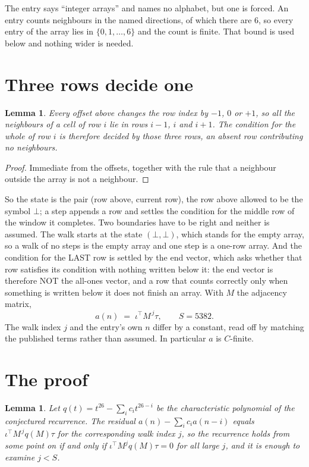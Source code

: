 \documentclass[11pt,a4paper]{article}
\theoremstyle{plain}
\newtheorem{lemma}[theorem]{Lemma}
\theoremstyle{definition}
\begin{document}
The entry says ``integer arrays'' and names no alphabet, but one is forced. An entry counts
neighbours in the named directions, of which there are $6$, so every entry of the array
lies in $\{0,1,\dots,6\}$ and the count is finite. That bound is used below and
nothing wider is needed.

\section{Three rows decide one}

\begin{lemma}\label{lem:win}
Every offset above changes the row index by $-1$, $0$ or $+1$, so all the neighbours of a cell
of row $i$ lie in rows $i-1$, $i$ and $i+1$. The condition for the whole of row $i$ is
therefore decided by those three rows, an absent row contributing no neighbours.
\end{lemma}

\begin{proof}
Immediate from the offsets, together with the rule that a neighbour outside the array is not a
neighbour.
\end{proof}

So the state is the pair (row above, current row), the row above allowed to be the symbol
$\bot$; a step appends a row and settles the condition for the middle row of the window it
completes. Two boundaries have to be right and neither is assumed. The walk starts at the state
$(\bot,\bot)$, which stands for the empty array, so a walk of no steps is the empty array and
one step is a one-row array. And the condition for the LAST row is settled by the end vector,
which asks whether that row satisfies its condition with nothing written below it: the end
vector is therefore NOT the all-ones vector, and a row that counts correctly only when
something is written below it does not finish an array. With $M$ the adjacency matrix,
\[
a(n)\;=\;\iota^{\!\top}M^{\,j}\tau ,\qquad S=5382.
\]
The walk index $j$ and the entry's own $n$ differ by a constant, read off by matching the
published terms rather than assumed. In particular $a$ is $C$-finite.

\section{The proof}

\begin{lemma}\label{lem:crit}
Let $q(t)=t^{26}-\sum_i c_it^{26-i}$ be the characteristic polynomial of the
conjectured recurrence. The residual $a(n)-\sum_ic_ia(n-i)$ equals
$\iota^{\!\top}M^{\,j}q(M)\tau$ for the corresponding walk index $j$, so the recurrence
holds from some point on if and only if $\iota^{\!\top}M^{j}q(M)\tau=0$ for all large $j$,
and it is enough to examine $j<S$.
\end{lemma}
\end{document}
